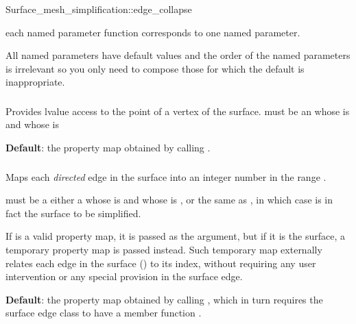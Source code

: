\begin{ccRefFunction}{Surface_mesh_simplification::edge_collapse}

each named parameter function corresponds to one named parameter.

All named parameters have default values and the order of the named parameters 
is irrelevant so you only need to compose those for which the default
is inappropriate.

\subsubsection{ }

Provides lvalue access to the point of a vertex of the surface.
 must be an 
whose  is
and whose  is 

\textbf{Default}: the property map obtained by calling .


\subsubsection{ }

Maps each {\em directed} edge in the surface into an integer number
in the range \ccc{[0,num_edge(surface)}.

 must be a either a
whose  is
and whose  is 
,
or the same as , in which case 
 is in fact the surface to be simplified.

If  is a valid property map, it is
passed as the argument, but if it is the surface, a
temporary property map is passed instead.
Such temporary map externally relates each edge 
in the surface () to its index,
without requiring any user intervention or any special
provision in the surface edge.

\textbf{Default}: the property map obtained by calling , which 
in turn requires the surface edge class to have a member function 
.


\end{ccRefFunction}
